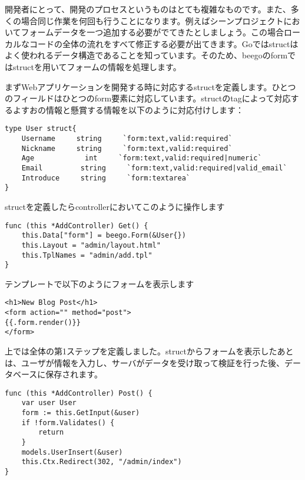 開発者にとって、開発のプロセスというものはとても複雑なものです。また、多くの場合同じ作業を何回も行うことになります。例えばシーンプロジェクトにおいてフォームデータを一つ追加する必要がでてきたとしましょう。この場合ローカルなコードの全体の流れをすべて修正する必要が出てきます。Goではstructはよく使われるデータ構造であることを知っています。そのため、beegoのformではstructを用いてフォームの情報を処理します。

まずWebアプリケーションを開発する時に対応するstructを定義します。ひとつのフィールドはひとつのform要素に対応しています。structのtagによって対応するよすおの情報と懸賞する情報を以下のように対応付けします：


\begin{lstlisting}[numbers=none]
type User struct{
    Username     string     `form:text,valid:required`
    Nickname     string     `form:text,valid:required`
    Age            int     `form:text,valid:required|numeric`
    Email         string     `form:text,valid:required|valid_email`
    Introduce     string     `form:textarea`
}
\end{lstlisting}

structを定義したらcontrollerにおいてこのように操作します

\begin{lstlisting}[numbers=none]
func (this *AddController) Get() {
    this.Data["form"] = beego.Form(&User{})
    this.Layout = "admin/layout.html"
    this.TplNames = "admin/add.tpl"
}        
\end{lstlisting}

テンプレートで以下のようにフォームを表示します



\begin{lstlisting}[numbers=none]
<h1>New Blog Post</h1>
<form action="" method="post">
{{.form.render()}}
</form>
\end{lstlisting}

上では全体の第1ステップを定義しました。structからフォームを表示したあとは、ユーザが情報を入力し、サーバがデータを受け取って検証を行った後、データベースに保存されます。


\begin{lstlisting}[numbers=none]
func (this *AddController) Post() {
    var user User
    form := this.GetInput(&user)
    if !form.Validates() {
        return
    }
    models.UserInsert(&user)
    this.Ctx.Redirect(302, "/admin/index")
}        
\end{lstlisting}

